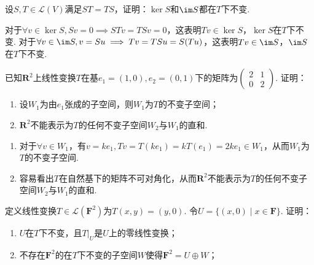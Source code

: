 \begin{exercise}

    \begin{exgroup}
        \item 设$S,T\in \mathcal{L}(V)$满足$ST=TS$，证明：$\ker S$和$\im S$都在$T$下不变.
        \begin{answer}
            对于$\forall v\in\ker S,Sv=0\implies STv=TSv=0$，这表明$Tv\in \ker S$，$\ker S$在$T$下不变.
            对于$\forall v \in \im S,v=Su\implies Tv=TSu=S(Tu)$，这表明$Tv \in \im S$，$\im S$在$T$下不变.
        \end{answer}
        \item 已知$\mathbf{R}^2$上线性变换$T$在基$e_1=(1,0),e_2=(0,1)$下的矩阵为$\begin{pmatrix}2 & 1 \\ 0 & 2\end{pmatrix}$. 证明：
        \begin{enumerate}
            \item 设$W_1$为由$e_1$张成的子空间，则$W_1$为$T$的不变子空间；

            \item $\mathbf{R}^2$不能表示为$T$的任何不变子空间$W_2$与$W_1$的直和.
        \end{enumerate}
        \begin{answer}
            \begin{enumerate}
                \item 对于$\forall v\in W_1$，有$v=ke_1,Tv=T(ke_1)=kT(e_1)=2ke_1\in W_1$，从而$W_1$为$T$的不变子空间.
                \item 容易看出$T$在自然基下的矩阵不可对角化，从而$\mathbf{R}^2$不能表示为$T$的任何不变子空间$W_2$与$W_1$的直和.
            \end{enumerate}
        \end{answer}

        \item 定义线性变换$T\in \mathcal{L}(\mathbf{F}^2)$为$T(x,y)=(y,0)$. 令$U=\{(x,0) \mid x\in\mathbf{F}\}$. 证明：
        \begin{enumerate}
            \item $U$在$T$下不变，且$T|_{U}$是$U$上的零线性变换；

            \item 不存在$\mathbf{F}^2$的在$T$下不变的子空间$W$使得$\mathbf{F}^2=U\oplus W$；


\end{enumerate}
\end{exgroup}
\end{exercise}
